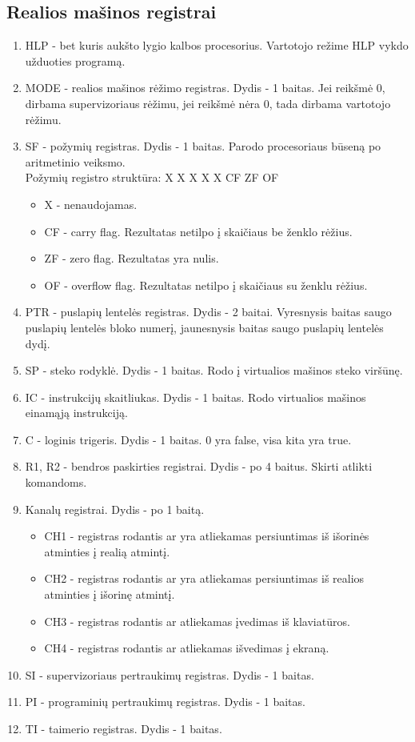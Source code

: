 	\subsection{Realios mašinos registrai}
	\begin{enumerate}
	\item HLP - bet kuris aukšto lygio kalbos procesorius. Vartotojo režime HLP vykdo užduoties programą.
	\item MODE - realios mašinos rėžimo registras. Dydis - 1 baitas. Jei reikšmė 0, dirbama supervizoriaus rėžimu, jei reikšmė nėra 0, tada dirbama vartotojo rėžimu.
	\item SF - požymių registras. Dydis - 1 baitas. Parodo procesoriaus būseną po aritmetinio veiksmo.\\
	Požymių registro struktūra: X X X X X CF ZF OF
	\begin{itemize}
		\item X - nenaudojamas.
		\item CF - carry flag. Rezultatas netilpo į skaičiaus be ženklo rėžius.
		\item ZF - zero flag. Rezultatas yra nulis.
		\item OF - overflow flag. Rezultatas netilpo į skaičiaus su ženklu rėžius.
	\end{itemize}
	\item PTR - puslapių lentelės registras. Dydis - 2 baitai. Vyresnysis baitas saugo puslapių lentelės bloko numerį, jaunesnysis baitas saugo puslapių lentelės dydį.
	\item SP - steko rodyklė. Dydis - 1 baitas. Rodo į virtualios mašinos steko viršūnę.
	\item IC - instrukcijų skaitliukas. Dydis - 1 baitas. Rodo virtualios mašinos einamąją instrukciją.
	\item C - loginis trigeris. Dydis - 1 baitas. 0 yra false, visa kita yra true.
	\item R1, R2 - bendros paskirties registrai. Dydis - po 4 baitus. Skirti atlikti komandoms.
	\item Kanalų registrai. Dydis - po 1 baitą.
	\begin{itemize}
		\item CH1 - registras rodantis ar yra atliekamas persiuntimas iš išorinės atminties į realią atmintį.
		\item CH2 - registras rodantis ar yra atliekamas persiuntimas iš realios atminties į išorinę atmintį.
		\item CH3 - registras rodantis ar atliekamas įvedimas iš klaviatūros.
		\item CH4 - registras rodantis ar atliekamas išvedimas į ekraną.
	\end{itemize}
	\item SI - supervizoriaus pertraukimų registras. Dydis - 1 baitas. 
	\item PI - programinių pertraukimų registras. Dydis - 1 baitas.
	\item TI - taimerio registras. Dydis - 1 baitas.
	
	\end{enumerate}	
	
